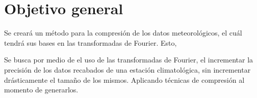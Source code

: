\section{Objetivo general}

Se creará un método para la compresión de los datos meteorológicos, el cuál tendrá sus bases en las transformadas de Fourier. Esto,

Se busca por medio de el uso de las transformadas de Fourier, el incrementar la precisión de los datos recabados de una estación climatológica, sin incrementar drásticamente el tamaño de los mismos. Aplicando técnicas de compresión al momento de generarlos.
